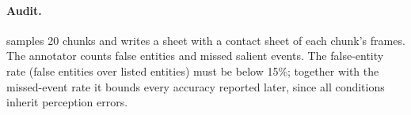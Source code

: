 \paragraph{Audit.}
 samples 20 chunks and writes a sheet with a
contact sheet of each chunk's frames. The annotator counts false entities and
missed salient events. The false-entity rate (false entities over listed
entities) must be below 15\%; together with the missed-event rate it bounds
every accuracy reported later, since all conditions inherit perception
errors.

